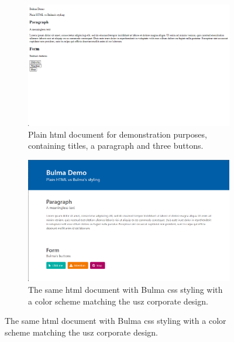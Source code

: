 \documentclass[\relativeRoot/main.tex]{subfiles}
\begin{document}
\begin{figure}
    \begin{subfigure}[b]{0.48\textwidth}
        \includegraphics[width=\textwidth, frame]{figures/demo_without_bulma.png}
        \caption[
            Plain demo HTML document
        ]{
            Plain \acrshort{html} document for demonstration purposes, containing titles, a paragraph and three buttons.
        }
        \label{fig:lyprox:plain}
    \end{subfigure}
    \hfill
    \begin{subfigure}[b]{0.48\textwidth}
        \includegraphics[width=\textwidth, frame]{figures/demo_with_bulma.png}
        \caption[
            HTML demo document with Bulma styling
        ]{
            The same \acrshort{html} document with Bulma \acrshort{css} styling with a color scheme matching the \gls{usz} corporate design.
        }
        \label{fig:lyprox:bulma}
    \end{subfigure}
    \label{fig:lyprox:plain_vs_bulma}
\end{figure}
\end{document}
